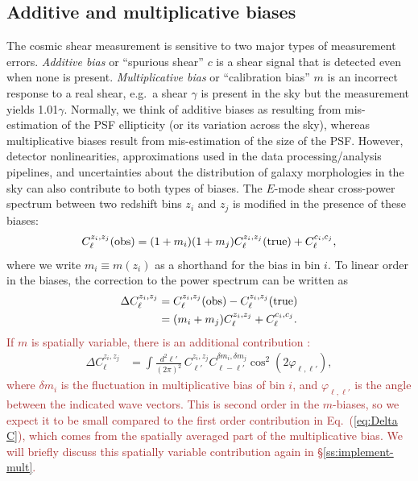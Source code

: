 \documentclass[usenatbib]{mnras}
\newcommand{\changetext}[1]{\textcolor{brown}{#1}}
\begin{document}
\subsection{Additive and multiplicative biases}
\label{ss:add_mult}

The cosmic shear measurement is sensitive to two major types of
measurement errors. {\em Additive bias} or ``spurious shear'' $c$ is a
shear signal that is detected even when none is present. {\em
Multiplicative bias} or ``calibration bias'' $m$ is an incorrect response
to a real shear, e.g.\ a shear $\gamma$ is present in the sky but the
measurement yields 1.01$\gamma$. Normally, we think of additive biases
as resulting from mis-estimation of the PSF ellipticity (or its
variation across the sky), whereas multiplicative biases result from
mis-estimation of the size of the PSF. However, detector
nonlinearities, approximations used in the data processing/analysis
pipelines, and uncertainties about the distribution of galaxy
morphologies in the sky can also contribute to both types of
biases.  The $E$-mode
shear cross-power spectrum between two redshift bins $z_i$ and $z_j$
is modified in the presence of these biases:
\begin{equation}
C_\ell^{z_i,z_j}({\rm obs}) = (1+m_i)(1+m_j)C_\ell^{z_i,z_j}({\rm true}) + C_\ell^{c_i,c_j},
\label{eq:mod}
\end{equation}
where we write $m_i\equiv m(z_i)$ as a shorthand for the bias in bin $i$. To linear order in
the biases, the correction to the power spectrum can be written as
\begin{align}
\Delta C_\ell^{z_i,z_j} &= C_\ell^{z_i,z_j}({\rm obs}) - C_\ell^{z_i,z_j}({\rm true}) \nonumber\\
&= (m_i+m_j)C_\ell^{z_i,z_j}+C_\ell^{c_i,c_j}.
\label{eq:Delta C}
\end{align}
\changetext{If $m$ is spatially variable, there is an additional contribution \citep[e.g.][]{2012MNRAS.423.3163K, 2016MNRAS.455.3319K}:}
\begin{align}
\Delta C_\ell^{z_i,z_j} &=
\int \frac{d^2{\boldsymbol\ell}'}{(2\pi)^2} \, C_{\ell'}^{z_i,z_j} C^{\delta m_i,\delta m_j}_{{\boldsymbol\ell}-{\boldsymbol\ell}'} \cos^2 (2\varphi_{{\boldsymbol\ell},{\boldsymbol\ell}'}),
\label{eq:DeltaC-mm}
\end{align}
\changetext{where $\delta m_i$ is the fluctuation in multiplicative bias of bin $i$, and $\varphi_{{\boldsymbol\ell},{\boldsymbol\ell}'}$ is the angle between the indicated wave vectors. This is second order in the $m$-biases, so we expect it to be small compared to the first order contribution in Eq.~(\ref{eq:Delta C}), which comes from the spatially averaged part of the multiplicative bias. We will briefly discuss this spatially variable contribution again in \S\ref{ss:implement-mult}.}
\end{document}
